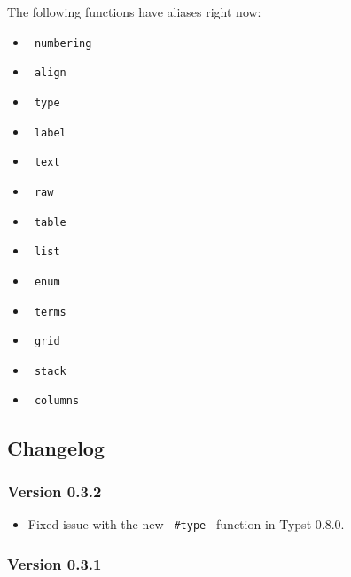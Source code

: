 \begin{Shaded}
\begin{Highlighting}[]
\OperatorTok{,}\OperatorTok{:} \NormalTok{ ) }\OperatorTok{=}\NormalTok{ [}
\OperatorTok{,}
\NormalTok{]}
\end{Highlighting}
\end{Shaded}

The following functions have aliases right now:

\begin{itemize}
\tightlist
\item
  \texttt{\ numbering\ }
\item
  \texttt{\ align\ }
\item
  \texttt{\ type\ }
\item
  \texttt{\ label\ }
\item
  \texttt{\ text\ }
\item
  \texttt{\ raw\ }
\item
  \texttt{\ table\ }
\item
  \texttt{\ list\ }
\item
  \texttt{\ enum\ }
\item
  \texttt{\ terms\ }
\item
  \texttt{\ grid\ }
\item
  \texttt{\ stack\ }
\item
  \texttt{\ columns\ }
\end{itemize}

\subsection{Changelog}\label{changelog}

\subsubsection{Version 0.3.2}\label{version-0.3.2}

\begin{itemize}
\tightlist
\item
  Fixed issue with the new \texttt{\ \#type\ } function in Typst 0.8.0.
\end{itemize}

\subsubsection{Version 0.3.1}\label{version-0.3.1}

